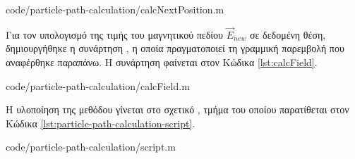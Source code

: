 
{code/particle-path-calculation/calcNextPosition.m}

Για τον υπολογισμό της τιμής του μαγνητικού πεδίου $\vec{E}_{new}$ σε δεδομένη θέση, δημιουργήθηκε η συνάρτηση  , η οποία πραγματοποιεί τη γραμμική παρεμβολή που αναφέρθηκε παραπάνω. 
Η συνάρτηση  φαίνεται στον Κώδικα \ref{lst:calcField}.


{code/particle-path-calculation/calcField.m}

Η υλοποίηση της μεθόδου γίνεται στο σχετικό , τμήμα του οποίου παρατίθεται στον Κώδικα \ref{lst:particle-path-calculation-script}.



{code/particle-path-calculation/script.m}

%



